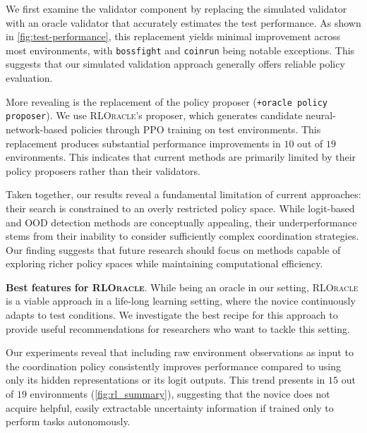 We first examine the validator component by replacing the simulated validator with an oracle validator that accurately estimates the test performance. 
As shown in \autoref{fig:test-performance}, this replacement yields minimal improvement across most environments, with \texttt{bossfight} and \texttt{coinrun} being notable exceptions. This suggests that our simulated validation approach generally offers reliable policy evaluation.

More revealing is the replacement of the policy proposer  (\texttt{+oracle policy proposer}). We use \textsc{RLOracle}'s proposer, which generates candidate neural-network-based policies through PPO training on test environments. This replacement produces substantial performance improvements in $10$ out of $19$ environments.
This indicates that current methods are primarily limited by their policy proposers rather than their validators.

Taken together, our results reveal a fundamental limitation of current approaches: their search is constrained to an overly restricted policy space. While logit-based and OOD detection methods are conceptually appealing, their underperformance stems from their inability to consider sufficiently complex coordination strategies. 
Our finding suggests that future research should focus on methods capable of exploring richer policy spaces while maintaining computational efficiency. 

\textbf{Best features for \textsc{RLOracle}}.
While being an oracle in our setting, \textsc{RLOracle} is a viable approach in a life-long learning setting, where the novice continuously adapts to test conditions. 
We investigate the best recipe for this approach to provide useful recommendations for researchers who want to tackle this setting.

Our experiments reveal that including raw environment observations as input to the coordination policy consistently improves performance compared to using only its hidden representations or its logit outputs.
This trend presents in $15$ out of $19$ environments (\autoref{fig:rl_summary}), suggesting that the novice does not acquire helpful, easily extractable uncertainty information if trained only to perform tasks autonomously.

